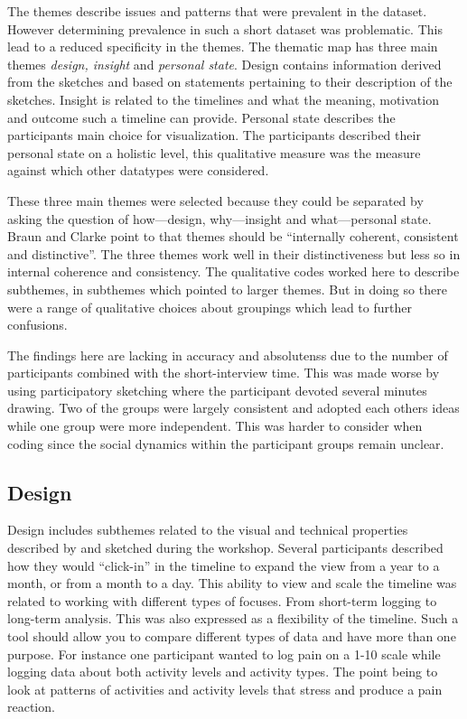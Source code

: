 \documentclass[UKenglish]{uiophd}
\begin{document}
		The themes describe issues and patterns that were prevalent in the dataset. However determining prevalence in such a short dataset was problematic. This lead to a reduced specificity in the themes. The thematic map has three main themes \textit{design, insight} and \textit{personal state}. Design contains information derived from the sketches and based on statements pertaining to their description of the sketches. Insight is related to the timelines and what the meaning, motivation and outcome such a timeline can provide. Personal state describes the participants main choice for visualization. The participants described their personal state on a holistic level, this qualitative measure was the measure against which other datatypes were considered.

		These three main themes were selected because they could be separated by asking the question of how---design, why---insight and what---personal state. Braun and Clarke point to that themes should be ``internally coherent, consistent and distinctive''\cite[p.96]{Braun2006Using}. The three themes work well in their distinctiveness but less so in internal coherence and consistency. The qualitative codes worked here to describe subthemes, in subthemes which pointed to larger themes. But in doing so there were a range of qualitative choices about groupings which lead to further confusions.

		The findings here are lacking in accuracy and absolutenss due to the number of participants combined with the short-interview time. This was made worse by using participatory sketching where the participant devoted several minutes drawing. Two of the groups were largely consistent and adopted each others ideas while one group were more independent. This was harder to consider when coding since the social dynamics within the participant groups remain unclear. 

	\subsection{Design}
		Design includes subthemes related to the visual and technical properties described by and sketched during the workshop. Several participants described how they would ``click-in'' in the timeline to expand the view from a year to a month, or from a month to a day. This ability to view and scale the timeline was related to working with different types of focuses. From short-term logging to long-term analysis. This was also expressed as a flexibility of the timeline. Such a tool should allow you to compare different types of data and have more than one purpose. For instance one participant wanted to log pain on a 1-10 scale while logging data about both activity levels and activity types. The point being to look at patterns of activities and activity levels that stress and produce a pain reaction.
\end{document}
